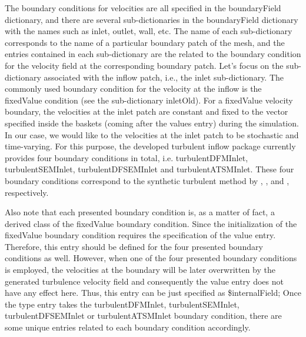 \noindent The boundary conditions for velocities are all specified in the \textcolor{mauve}{boundaryField} dictionary, and there are several sub-dictionaries in the \textcolor{mauve}{boundaryField} dictionary with the names such as \textcolor{mauve}{inlet}, \textcolor{mauve}{outlet}, \textcolor{mauve}{wall}, etc. The name of each sub-dictionary corresponds to the name of a particular boundary patch of the mesh, and the entries contained in each sub-dictionary are the related to the boundary condition for the velocity field at the corresponding boundary patch. Let's focus on the sub-dictionary associated with the inflow patch, i.e., the \textcolor{mauve}{inlet} sub-dictionary. The commonly used boundary condition for the velocity at the inflow is the \textcolor{mauve}{fixedValue} condition (see the sub-dictionary \textcolor{mauve}{inletOld}). For a \textcolor{mauve}{fixedValue} velocity boundary, the velocities at the \textcolor{mauve}{inlet} patch are constant and fixed to the vector specified inside the baskets (coming after the \textcolor{mauve}{values} entry) during the simulation. In our case, we would like to the velocities at the \textcolor{mauve}{inlet} patch to be stochastic and time-varying. For this purpose, the developed turbulent inflow package currently provides four boundary conditions in total, i.e. \textcolor{mauve}{turbulentDFMInlet}, \textcolor{mauve}{turbulentSEMInlet}, \textcolor{mauve}{turbulentDFSEMInlet} and \textcolor{mauve}{turbulentATSMInlet}. These four boundary conditions correspond to the synthetic turbulent method by \cite{klein2003}, \cite{jarrin2006}, \cite{poletto2013} and \cite{kroger2018}, respectively.

Also note that each presented boundary condition is, as a matter of fact, a derived class of the \textcolor{mauve}{fixedValue} boundary condition. Since the initialization of the \textcolor{mauve}{fixedValue} boundary condition requires the specification of the \textcolor{mauve}{value} entry. Therefore, this entry should be defined for the four presented boundary conditions as well. However, when one of the four presented boundary conditions is employed, the velocities at the boundary will be later overwritten by the generated turbulence velocity field and consequently the \textcolor{mauve}{value} entry does not have any effect here. Thus, this entry can be just specified as \textcolor{mauve}{{\$}internalField}; Once the \textcolor{mauve}{type} entry takes the \textcolor{mauve}{turbulentDFMInlet}, \textcolor{mauve}{turbulentSEMInlet}, \textcolor{mauve}{turbulentDFSEMInlet} or \textcolor{mauve}{turbulentATSMInlet} boundary condition, there are some unique entries related to each boundary condition accordingly. 

